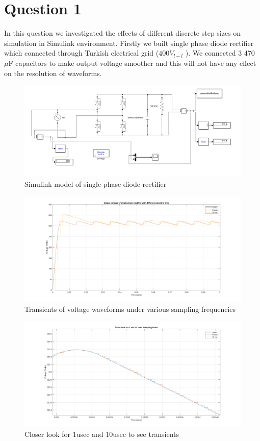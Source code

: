 \documentclass[fleqn, a4paper]{report}
\begin{document}
\section*{Question 1}
In this question we investigated the effects of different discrete step sizes on simulation in Simulink environment. Firstly we built single phase diode rectifier which connected through Turkish electrical grid ($400 V_{l-l}$ ). We connected 3 470 $\mu$F capacitors to make output voltage smoother and this will not have any effect on the resolution of waveforms. 
\begin{figure}[H]
  \includegraphics[width=\linewidth]{question-1-simulink-model.PNG}
  \caption{Simulink model of single phase diode rectifier}
  \label{fig:simulink2}
\end{figure}
\begin{figure}[H]
  \includegraphics[width=\linewidth]{Q1_plots_different_samplings.png}
  \caption{Transients of voltage waveforms under various sampling frequencies}
  \label{fig:simulink2}
\end{figure}
\begin{figure}[H]
  \includegraphics[width=\linewidth]{closer-look.png}
  \caption{Closer look for 1usec and 10usec to see transients}
  \label{fig:simulink2}
\end{figure}
\end{document}
